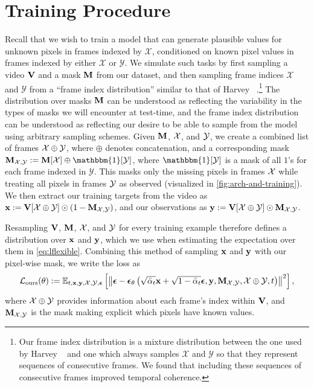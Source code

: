 \section{Training Procedure} 
Recall that we wish to train a model that can generate plausible values for unknown pixels in frames indexed by $\mathcal{X}$, conditioned on known pixel values in frames indexed by either $\mathcal{X}$ or $\mathcal{Y}$. We simulate such tasks by first sampling a video $\mathbf{V}$ and a mask $\mathbf{M}$ from our dataset,  and then sampling frame indices $\mathcal{X}$ and $\mathcal{Y}$ from a ``frame index distribution'' similar to that of Harvey \etal~\cite{fdm}.\footnote{Our frame index distribution is a mixture distribution between the one used by Harvey \etal~\cite{fdm} and one which always samples $\mathcal{X}$ and $\mathcal{Y}$ so that they represent sequences of consecutive frames. We found that including these sequences of consecutive frames improved temporal coherence.}
The distribution over masks $\mathbf{M}$ can be understood as reflecting the variability in the types of masks we will encounter at test-time, and the frame index distribution can be understood as reflecting our desire to be able to sample from the model using arbitrary sampling schemes. Given $\mathbf{M}$, $\mathcal{X}$, and $\mathcal{Y}$, we create a combined list of frames $\mathcal{X} \oplus \mathcal{Y}$, where $\oplus$ denotes concatenation, and a corresponding mask $\bM_{\fX,\fY} := \bM[\fX] \oplus \mathbbm{1}[\fY]$, where $\mathbbm{1}[\mathcal{Y}]$ is a mask of all $1$'s for each frame indexed in $\mathcal{Y}$. This masks only the missing pixels in frames $\mathcal{X}$ while treating all pixels in frames $\mathcal{Y}$ as observed (visualized in \cref{fig:arch-and-training}).
We then extract our training targets from the video as $\mathbf{x} := \mathbf{V}[\mathcal{X}\oplus\mathcal{Y}] \odot (1-\mathbf{M}_{\mathcal{X},\mathcal{Y}})$, and our observations as $\mathbf{y} := \mathbf{V}[\mathcal{X}\oplus\mathcal{Y}] \odot \mathbf{M}_{\mathcal{X},\mathcal{Y}}$.

Resampling $\mathbf{V}$, $\mathbf{M}$, $\mathcal{X}$, and $\mathcal{Y}$ for every training example therefore defines a distribution over $\mathbf{x}$ and $\mathbf{y}$, which we use when estimating the expectation over them in \cref{eq:lflexible}. Combining this method of sampling $\mathbf{x}$ and $\mathbf{y}$ with our pixel-wise mask, we write the loss as
\begin{equation}
    \mathcal{L}_{\text{ours}}(\theta):=\mathbb{E}_{t, \mathbf{x}, \mathbf{y}, \mathcal{X}, \mathcal{Y}, \boldsymbol{\epsilon}}\left[\left\|\boldsymbol{\epsilon}-\boldsymbol{\epsilon}_\theta\left(\sqrt{\bar{\alpha}_t} \mathbf{x}+\sqrt{1-\bar{\alpha}_t} \boldsymbol{\epsilon}, \mathbf{y}, \mathbf{M}_{\mathcal{X},\mathcal{Y}}, \mathcal{X}\oplus\mathcal{Y}, t\right)\right\|^2\right],
    \label{eq:lours}
\end{equation}
where $\mathcal{X}\oplus\mathcal{Y}$ provides information about each frame's index within $\mathbf{V}$, and $\mathbf{M}_{\mathcal{X},\mathcal{Y}}$ is the mask making explicit which pixels have known values.




